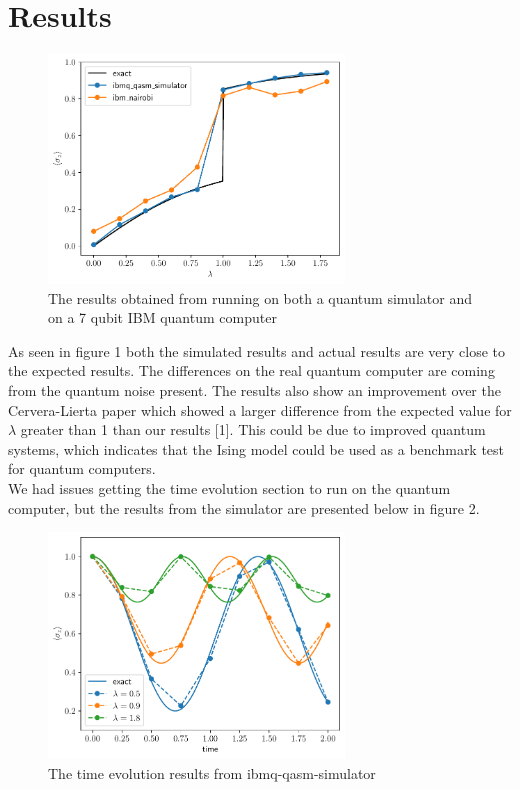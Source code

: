 \documentclass[12pt]{article}
\begin{document}
  \section{Results}
   
    \begin{figure}[h]
      \centering
      \includegraphics[width=0.7\textwidth]{images/ground-state-magnetization}
      \caption{The results obtained from running on both a quantum simulator and on a 7 qubit IBM quantum computer %
              \label{fig:ground-state-magnetization}}
    \end{figure}

    As seen in figure 1 both the simulated results and actual results are very close to the expected results. The differences on the real quantum computer are coming from the quantum noise present. The results also show an improvement over the Cervera-Lierta paper which showed a larger difference from the expected value for \begin{math}\lambda\end{math} greater than 1 than our results [1]. This could be due to improved quantum systems, which indicates that the Ising model could be used as a benchmark test for quantum computers. \\

    We had issues getting the time evolution section to run on the quantum computer, but the results from the simulator are presented below in figure 2.
    \begin{figure}[h!]
        \centering
        \includegraphics[width=0.7\textwidth]{images/time-evolution-magnetization-test}
        \caption{The time evolution results from ibmq-qasm-simulator %
              \label{fig:time-evolution-mangetization-test}}
    \end{figure}
\end{document}
